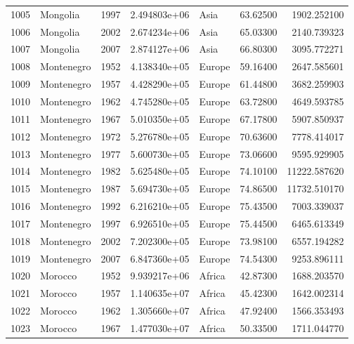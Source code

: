 \documentclass[
  letterpaper,
  DIV=11,
  numbers=noendperiod]{scrreprt}
\begin{document}
\begin{tabular}{llrrlrr}
1005 &                  Mongolia &  1997 &  2.494803e+06 &      Asia &  63.62500 &    1902.252100 \\
1006 &                  Mongolia &  2002 &  2.674234e+06 &      Asia &  65.03300 &    2140.739323 \\
1007 &                  Mongolia &  2007 &  2.874127e+06 &      Asia &  66.80300 &    3095.772271 \\
1008 &                Montenegro &  1952 &  4.138340e+05 &    Europe &  59.16400 &    2647.585601 \\
1009 &                Montenegro &  1957 &  4.428290e+05 &    Europe &  61.44800 &    3682.259903 \\
1010 &                Montenegro &  1962 &  4.745280e+05 &    Europe &  63.72800 &    4649.593785 \\
1011 &                Montenegro &  1967 &  5.010350e+05 &    Europe &  67.17800 &    5907.850937 \\
1012 &                Montenegro &  1972 &  5.276780e+05 &    Europe &  70.63600 &    7778.414017 \\
1013 &                Montenegro &  1977 &  5.600730e+05 &    Europe &  73.06600 &    9595.929905 \\
1014 &                Montenegro &  1982 &  5.625480e+05 &    Europe &  74.10100 &   11222.587620 \\
1015 &                Montenegro &  1987 &  5.694730e+05 &    Europe &  74.86500 &   11732.510170 \\
1016 &                Montenegro &  1992 &  6.216210e+05 &    Europe &  75.43500 &    7003.339037 \\
1017 &                Montenegro &  1997 &  6.926510e+05 &    Europe &  75.44500 &    6465.613349 \\
1018 &                Montenegro &  2002 &  7.202300e+05 &    Europe &  73.98100 &    6557.194282 \\
1019 &                Montenegro &  2007 &  6.847360e+05 &    Europe &  74.54300 &    9253.896111 \\
1020 &                   Morocco &  1952 &  9.939217e+06 &    Africa &  42.87300 &    1688.203570 \\
1021 &                   Morocco &  1957 &  1.140635e+07 &    Africa &  45.42300 &    1642.002314 \\
1022 &                   Morocco &  1962 &  1.305660e+07 &    Africa &  47.92400 &    1566.353493 \\
1023 &                   Morocco &  1967 &  1.477030e+07 &    Africa &  50.33500 &    1711.044770 \\

\end{tabular}
\end{document}
